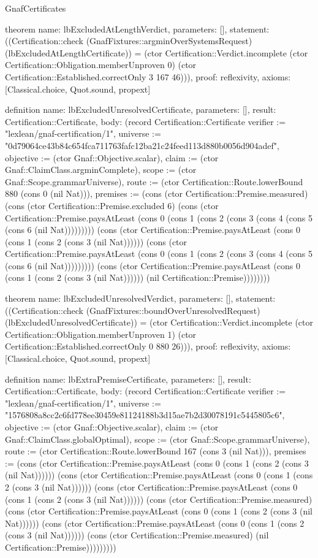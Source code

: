 \begin{lexlean}{GnafCertificates}
\begin{semanticmodule}
theorem{
  name: lbExcludedAtLengthVerdict,
  parameters: [],
  statement: ((Certification::check (GnafFixtures::argminOverSystemsRequest) (lbExcludedAtLengthCertificate)) = (ctor Certification::Verdict.incomplete (ctor Certification::Obligation.memberUnproven 0) (ctor Certification::Established.correctOnly 3 167 46))),
  proof: reflexivity{},
  axioms: [Classical.choice, Quot.sound, propext]
}

definition{
  name: lbExcludedUnresolvedCertificate,
  parameters: [],
  result: Certification::Certificate,
  body: (record Certification::Certificate {verifier := "lexlean/gnaf-certification/1", universe := "0d79064ce43b84c654fca711763fafc12ba21c24feed113d880b0056d904adef", objective := (ctor Gnaf::Objective.scalar), claim := (ctor Gnaf::ClaimClass.argminComplete), scope := (ctor Gnaf::Scope.grammarUniverse), route := (ctor Certification::Route.lowerBound 880 (cons 0 (nil Nat))), premises := (cons (ctor Certification::Premise.measured) (cons (ctor Certification::Premise.excluded 6) (cons (ctor Certification::Premise.paysAtLeast (cons 0 (cons 1 (cons 2 (cons 3 (cons 4 (cons 5 (cons 6 (nil Nat))))))))) (cons (ctor Certification::Premise.paysAtLeast (cons 0 (cons 1 (cons 2 (cons 3 (nil Nat)))))) (cons (ctor Certification::Premise.paysAtLeast (cons 0 (cons 1 (cons 2 (cons 3 (cons 4 (cons 5 (cons 6 (nil Nat))))))))) (cons (ctor Certification::Premise.paysAtLeast (cons 0 (cons 1 (cons 2 (cons 3 (nil Nat)))))) (nil Certification::Premise)))))))})
}

theorem{
  name: lbExcludedUnresolvedVerdict,
  parameters: [],
  statement: ((Certification::check (GnafFixtures::boundOverUnresolvedRequest) (lbExcludedUnresolvedCertificate)) = (ctor Certification::Verdict.incomplete (ctor Certification::Obligation.memberUnproven 1) (ctor Certification::Established.correctOnly 0 880 26))),
  proof: reflexivity{},
  axioms: [Classical.choice, Quot.sound, propext]
}

definition{
  name: lbExtraPremiseCertificate,
  parameters: [],
  result: Certification::Certificate,
  body: (record Certification::Certificate {verifier := "lexlean/gnaf-certification/1", universe := "1576808a8cc2c6fd778ee30459e81124188b3d15ae7b2d30078191c5445805c6", objective := (ctor Gnaf::Objective.scalar), claim := (ctor Gnaf::ClaimClass.globalOptimal), scope := (ctor Gnaf::Scope.grammarUniverse), route := (ctor Certification::Route.lowerBound 167 (cons 3 (nil Nat))), premises := (cons (ctor Certification::Premise.paysAtLeast (cons 0 (cons 1 (cons 2 (cons 3 (nil Nat)))))) (cons (ctor Certification::Premise.paysAtLeast (cons 0 (cons 1 (cons 2 (cons 3 (nil Nat)))))) (cons (ctor Certification::Premise.paysAtLeast (cons 0 (cons 1 (cons 2 (cons 3 (nil Nat)))))) (cons (ctor Certification::Premise.measured) (cons (ctor Certification::Premise.paysAtLeast (cons 0 (cons 1 (cons 2 (cons 3 (nil Nat)))))) (cons (ctor Certification::Premise.paysAtLeast (cons 0 (cons 1 (cons 2 (cons 3 (nil Nat)))))) (cons (ctor Certification::Premise.measured) (nil Certification::Premise))))))))})
}


\end{semanticmodule}
\end{lexlean}
